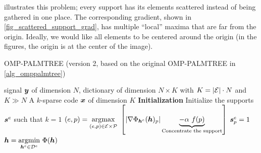 \noindent
{} illustrates this problem; every support has its elements scattered instead of being gathered in one place. The corresponding gradient, shown in \cref{fig_scattered_support_grad}, has multiple “local” maxima that are far from the origin. Ideally, we would like all elements to be centered around the origin (in the figures, the origin is at the center of the image).

\begin{algorithm}[!h]
    \caption{OMP-PALMTREE (version 2, based on the original OMP-PALMTREE in \cref{alg_omppalmtree})}\label{alg_omppalmtree2}
  \begin{algorithmic}[1]
    \Input signal $\bm{y}$ of dimension $N$, dictionary of 
   dimension $N \times K$ with $K = |\mathcal E| \cdot N$ and $K \gg N$
    \Output A $k$-sparse code $\bm{x}$ of dimension $K$
    \State \textbf{Initialization} Initialize the supports $\bm{s}^e$ such that $k=1$
      \State $(e,p) = \underset{(e,p) \in \mathcal E \times \mathcal P}{\operatorname*{\arg\!\max}}~ \left[ |\nabla \Phi_{\bm{h}^e}(\bm{h})_p| \underbrace{ - \alpha~f(p)}_{\text{Concentrate the support}} \right]$\label{alg_omppalmtree2_find}
      \State $\bm{s}^e_p = 1$
      \State $\bm{h} = \underset{\bm{h}^e \in {\mathcal D}^e}{\operatorname{argmin}}~ \Phi(\bm{h})$\label{alg_omppalmtree2_ftl}
    \EndFor
  \end{algorithmic}
\end{algorithm}

